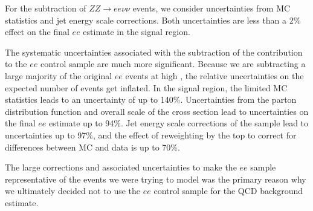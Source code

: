 
For the subtraction of $ZZ \rightarrow ee\nu\nu$ events, 
we consider uncertainties from
MC statistics and jet energy scale corrections.
Both uncertainties are less than a 2\% effect
on the final $ee$ estimate in the signal region.

The systematic uncertainties associated with 
the subtraction of the \ttbar contribution to the $ee$ control
sample are much more significant. 
Because we are subtracting a large majority of the
original $ee$ events at high \ETmiss, the relative
uncertainties on the expected number of \ttbar events get inflated.
In the signal region, the limited MC \ttbar statistics
leads to an uncertainty of up to 140\%. Uncertainties
from the parton distribution function and overall
scale of the cross section lead to uncertainties
on the final $ee$ estimate up to 94\%.
Jet energy scale corrections
of the \ttbar sample lead to uncertainties up to
97\%, and the effect of reweighting by the
top \pt to correct for differences between
MC and data is up to 70\%.

The large corrections and associated uncertainties
to make the $ee$ sample representative of the
events we were trying to model
was the primary reason why we ultimately
decided not to use the $ee$ control sample for the
QCD background estimate.


